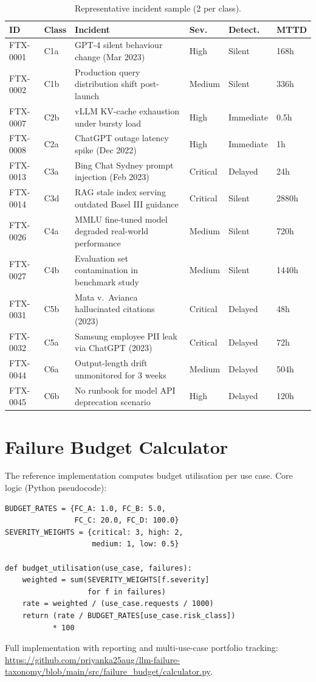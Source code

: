\documentclass{article}
\begin{document}
\begin{table}[h]
\caption{Representative incident sample (2 per class).}
\label{tab:dataset_sample}
\centering
\small
\begin{tabular}{llL{4.5cm}lll}
\toprule
\textbf{ID} & \textbf{Class} & \textbf{Incident} & \textbf{Sev.} &
\textbf{Detect.} & \textbf{MTTD} \\
\midrule
FTX-0001 & C1a & GPT-4 silent behaviour change (Mar 2023) & High & Silent & 168h \\
FTX-0002 & C1b & Production query distribution shift post-launch & Medium & Silent & 336h \\
\midrule
FTX-0007 & C2b & vLLM KV-cache exhaustion under bursty load & High & Immediate & 0.5h \\
FTX-0008 & C2a & ChatGPT outage latency spike (Dec 2022) & High & Immediate & 1h \\
\midrule
FTX-0013 & C3a & Bing Chat Sydney prompt injection (Feb 2023) & Critical & Delayed & 24h \\
FTX-0014 & C3d & RAG stale index serving outdated Basel III guidance & Critical & Silent & 2880h \\
\midrule
FTX-0026 & C4a & MMLU fine-tuned model degraded real-world performance & Medium & Silent & 720h \\
FTX-0027 & C4b & Evaluation set contamination in benchmark study & Medium & Silent & 1440h \\
\midrule
FTX-0031 & C5b & Mata v.\ Avianca hallucinated citations (2023) & Critical & Delayed & 48h \\
FTX-0032 & C5a & Samsung employee PII leak via ChatGPT (2023) & Critical & Delayed & 72h \\
\midrule
FTX-0044 & C6a & Output-length drift unmonitored for 3 weeks & Medium & Delayed & 504h \\
FTX-0045 & C6b & No runbook for model API deprecation scenario & High & Delayed & 120h \\
\bottomrule
\end{tabular}
\end{table}

\section{Failure Budget Calculator}
\label{appendix:calculator}

The reference implementation computes budget utilisation per use case.
Core logic (Python pseudocode):

\begin{verbatim}
BUDGET_RATES = {FC_A: 1.0, FC_B: 5.0,
                FC_C: 20.0, FC_D: 100.0}
SEVERITY_WEIGHTS = {critical: 3, high: 2,
                    medium: 1, low: 0.5}

def budget_utilisation(use_case, failures):
    weighted = sum(SEVERITY_WEIGHTS[f.severity]
                   for f in failures)
    rate = weighted / (use_case.requests / 1000)
    return (rate / BUDGET_RATES[use_case.risk_class])
           * 100
\end{verbatim}

Full implementation with reporting and multi-use-case portfolio tracking:
\url{https://github.com/priyanka25aug/llm-failure-taxonomy/blob/main/src/failure_budget/calculator.py}.
\end{document}
